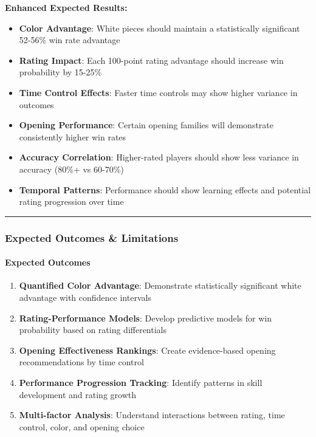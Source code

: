 \documentclass[
]{article}
\providecommand{\tightlist}{%
  \setlength{\itemsep}{0pt}\setlength{\parskip}{0pt}}
\begin{document}
\textbf{Enhanced Expected Results:}

\begin{itemize}
\tightlist
\item
  \textbf{Color Advantage}: White pieces should maintain a statistically
  significant 52-56\% win rate advantage
\item
  \textbf{Rating Impact}: Each 100-point rating advantage should
  increase win probability by 15-25\%
\item
  \textbf{Time Control Effects}: Faster time controls may show higher
  variance in outcomes
\item
  \textbf{Opening Performance}: Certain opening families will
  demonstrate consistently higher win rates
\item
  \textbf{Accuracy Correlation}: Higher-rated players should show less
  variance in accuracy (80\%+ vs 60-70\%)
\item
  \textbf{Temporal Patterns}: Performance should show learning effects
  and potential rating progression over time
\end{itemize}

\begin{center}\rule{0.5\linewidth}{0.5pt}\end{center}

\subsubsection{Expected Outcomes \&
Limitations}\label{expected-outcomes-limitations}

\paragraph{Expected Outcomes}\label{expected-outcomes}

\begin{enumerate}
\def\labelenumi{\arabic{enumi}.}
\tightlist
\item
  \textbf{Quantified Color Advantage}: Demonstrate statistically
  significant white advantage with confidence intervals
\item
  \textbf{Rating-Performance Models}: Develop predictive models for win
  probability based on rating differentials\\
\item
  \textbf{Opening Effectiveness Rankings}: Create evidence-based opening
  recommendations by time control
\item
  \textbf{Performance Progression Tracking}: Identify patterns in skill
  development and rating growth
\item
  \textbf{Multi-factor Analysis}: Understand interactions between
  rating, time control, color, and opening choice
\end{enumerate}
\end{document}

